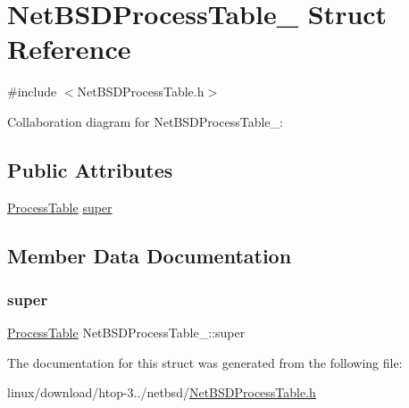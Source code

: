 \hypertarget{structNetBSDProcessTable__}{}\section{Net\+B\+S\+D\+Process\+Table\+\_\+ Struct Reference}
\label{structNetBSDProcessTable__}


{\ttfamily \#include $<$Net\+B\+S\+D\+Process\+Table.\+h$>$}



Collaboration diagram for Net\+B\+S\+D\+Process\+Table\+\_\+\+:
\subsection*{Public Attributes}
\begin{DoxyCompactItemize}
\item 
\hyperlink{ProcessTable_8h_a54ec62da6f9d80d4d06e3845a2597a80}{Process\+Table} \hyperlink{structNetBSDProcessTable___ad9756e3572ebdc92abadeeb426e1489a}{super}
\end{DoxyCompactItemize}


\subsection{Member Data Documentation}
\mbox{\label{structNetBSDProcessTable___ad9756e3572ebdc92abadeeb426e1489a}} 
\subsubsection{\texorpdfstring{super}{super}}
{\footnotesize\ttfamily \hyperlink{ProcessTable_8h_a54ec62da6f9d80d4d06e3845a2597a80}{Process\+Table} Net\+B\+S\+D\+Process\+Table\+\_\+\+::super}



The documentation for this struct was generated from the following file\+:\begin{DoxyCompactItemize}
\item 
linux/download/htop-\/3../netbsd/\hyperlink{NetBSDProcessTable_8h}{Net\+B\+S\+D\+Process\+Table.\+h}\end{DoxyCompactItemize}
